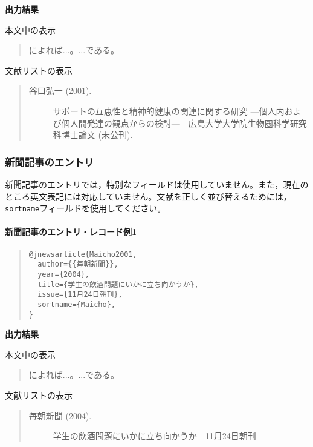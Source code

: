 \documentclass[12pt]{ltjsarticle}
\begin{document}
\textbf{出力結果}

本文中の表示
\begin{quote}
\textcite{Taniguchi2001}によれば...。...である\parencite{Taniguchi2001}。
\end{quote}

文献リストの表示
\begin{quote}
\begin{description}
  \item[\textrm{谷口弘一 (2001).}]サポートの互恵性と精神的健康の関連に関する研究 ---個人内および個人間発達の観点からの検討---　広島大学大学院生物圏科学研究科博士論文 (未公刊).
\end{description}
\end{quote}


\subsubsection{新聞記事のエントリ}

新聞記事のエントリでは，特別なフィールドは使用していません。また，現在のところ英文表記には対応していません。文献を正しく並び替えるためには，\texttt{sortname}フィールドを使用してください。

\paragraph{新聞記事のエントリ・レコード例1}


\begin{quote}
\begin{verbatim}
@jnewsarticle{Maicho2001,
  author={{毎朝新聞}},
  year={2004},
  title={学生の飲酒問題にいかに立ち向かうか},
  issue={11月24日朝刊},
  sortname={Maicho},
}
\end{verbatim}
\end{quote}

\textbf{出力結果}

本文中の表示
\begin{quote}
\textcite{Maicho2001}によれば...。...である\parencite{Maicho2001}。
\end{quote}

文献リストの表示
\begin{quote}
\begin{description}
  \item[\textrm{毎朝新聞 (2004).}]学生の飲酒問題にいかに立ち向かうか　11月24日朝刊
\end{description}
\end{quote}
\end{document}
